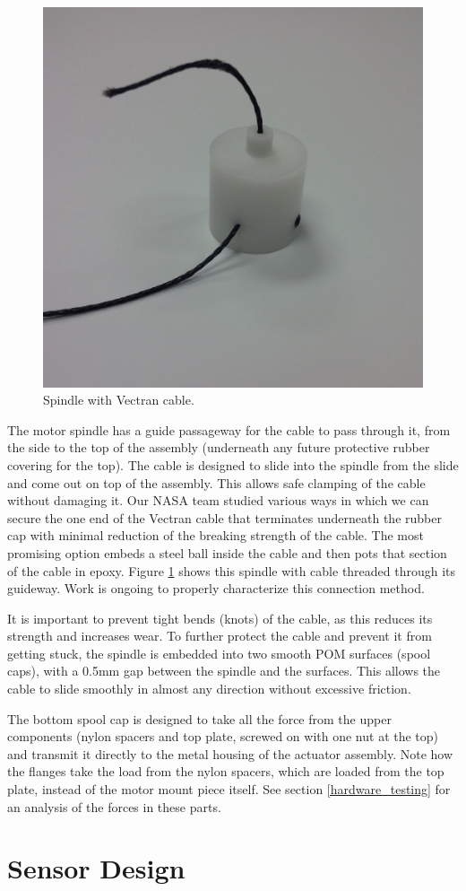 \documentclass[12pt]{report}
\begin{document}
\begin{figure}
   \centering
   \includegraphics[width=0.33\columnwidth]{img/spindle} 
   \caption{Spindle with Vectran cable.}
   \label{spindle_pic}
\end{figure}

The motor spindle has a guide passageway for the cable to pass through it, 
from the side to the top of the assembly (underneath any future protective rubber covering for the top).
The cable is designed to slide into the spindle from the slide and come out on top of the assembly.
This allows safe clamping of the cable without damaging it.
Our NASA team studied various ways in which we can secure the one end of the Vectran cable that terminates underneath the rubber cap with minimal reduction of the breaking strength of the cable.
The most promising option embeds a steel ball inside the cable and then pots that section of the cable in epoxy.
Figure \ref{spindle_pic} shows this spindle with cable threaded through its guideway.
Work is ongoing to properly characterize this connection method.


It is important to prevent tight bends (knots) of the cable, as this reduces its strength and increases wear.
To further protect the cable and prevent it from getting stuck, the spindle is embedded into two smooth POM surfaces (spool caps), 
with a 0.5mm gap between the spindle and the surfaces.
This allows the cable to slide smoothly in almost any direction without excessive friction.

The bottom spool cap is designed to take all the force from the upper components (nylon spacers and top plate, screwed on with one nut at the top) and transmit it directly to the metal housing of the actuator assembly.
Note how the flanges take the load from the nylon spacers, which are loaded from the top plate, instead of the motor mount piece itself.
See section \ref{hardware_testing} for an analysis of the forces in these parts.

\section{Sensor Design}
\end{document}
